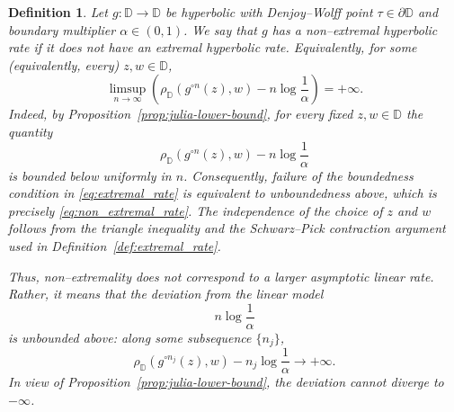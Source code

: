 \documentclass[10pt,a4paper]{amsart}
\numberwithin{equation}{section}
\newtheorem{definition}[equation]{Definition}
\begin{document}
\begin{definition}
\label{def:non-extremal_rate}
Let $g:\mathbb{D}\to\mathbb{D}$ be hyperbolic with Denjoy--Wolff point
$\tau\in\partial\mathbb{D}$ and boundary multiplier
$\alpha\in(0,1)$. We say that $g$ has a
\emph{non--extremal hyperbolic rate} if it does not have an extremal
hyperbolic rate. Equivalently, for some (equivalently, every)
$z,w\in\mathbb{D}$,
\begin{equation*}
\label{eq:non_extremal_rate}
\limsup_{n\to\infty}
\left(
\rho_{\mathbb{D}}(g^{\circ n}(z),w)
-
n\log\frac{1}{\alpha}
\right)
=
+\infty.
\end{equation*}
Indeed, by Proposition~\ref{prop:julia-lower-bound}, for every fixed
$z,w\in\mathbb{D}$ the quantity
\begin{equation*}
\rho_{\mathbb{D}}(g^{\circ n}(z),w)
-
n\log\frac{1}{\alpha}
\end{equation*}
is bounded below uniformly in $n$. Consequently, failure of the
boundedness condition in \eqref{eq:extremal_rate} is equivalent to
unboundedness above, which is precisely \eqref{eq:non_extremal_rate}.
The independence of the choice of $z$ and $w$ follows from the
triangle inequality and the Schwarz--Pick contraction argument used
in Definition~\ref{def:extremal_rate}.

Thus, non--extremality does not correspond to a larger asymptotic
linear rate. Rather, it means that the deviation from the linear
model
\begin{equation*}
n\log\frac{1}{\alpha}
\end{equation*}
is unbounded above: along some subsequence $\{n_j\}$,
\begin{equation*}
\rho_{\mathbb{D}}(g^{\circ n_j}(z),w)
-
n_j\log\frac{1}{\alpha}
\longrightarrow+\infty.
\end{equation*}
In view of Proposition~\ref{prop:julia-lower-bound}, the deviation
cannot diverge to $-\infty$.
\end{definition}
\end{document}
